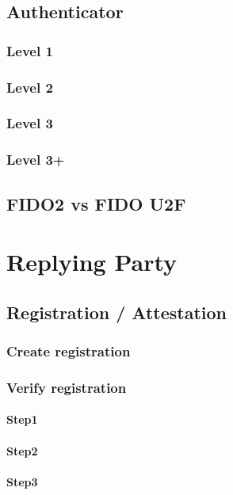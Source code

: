 \documentclass[a4paper, 11pt]{scrartcl}
\begin{document}
\subsection{Authenticator}

\subsubsection{Level 1}
\subsubsection{Level 2}
\subsubsection{Level 3}
\subsubsection{Level 3+}


\subsection{FIDO2 vs FIDO U2F}

\section{Replying Party}
\label{sec:replying_party}

\subsection{Registration / Attestation}

\subsubsection{Create registration}

\subsubsection{Verify registration}

\paragraph{Step1}
\paragraph{Step2}
\paragraph{Step3}
\end{document}
